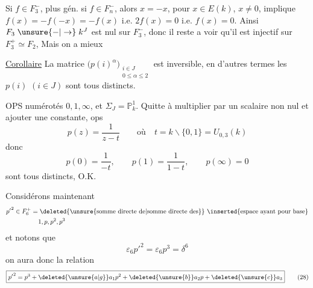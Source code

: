 Si $f\in F_3^-$, plus gén. si $f\in F_n^-$, alors $x=-x$, pour $x\in E(k)$, $x\ne0$, implique $f(x)=-f(-x)=-f(x)$ i.e. $2f(x)=0$ i.e. $f(x)=0$. Ainsi $F_3\mathrel{\unsure{-|\to}}k^{J}$ est nul sur $F_3^-$, donc il reste a voir qu'il est injectif sur $F_3^+\simeq F_2$, Mais on a mieux

\uline{Corollaire} La matrice   $\bigl(p(i)^\alpha\bigr)_{\substack{i\in J\\0\leq\alpha\leq2}}$ est inversible, en d'autres termes les $p(i)$ $(i\in J)$ sont tous distincts.

OPS   numérotés $0,1,\infty$, et $\Sigma_J=\mathbb P^1_k$. Quitte à multiplier par un scalaire non nul et ajouter une constante, ops
\[
 p(z)=\frac1{z-t}\qquad\text{où}\quad t=k\smallsetminus\{0,1\}=U_{0,3}(k)
\]
donc
\[
 p(0)=\frac1{-t},\qquad p(1)=\frac1{1-t},\qquad p(\infty)=0
\]
sont tous distincts, O.K.

 Considérons maintenant
\[
 \begin{aligned}
 &{p'}^{2}\in F_6^+=\deleted{\text{\unsure{somme directe de|somme directe des}}}\ \inserted{\text{espace ayant pour base}}\\
 &\hspace{5em}1,p,p^2,p^3
 \end{aligned}
\]
et notons que
\[
 \varepsilon_6{p'}^2=\varepsilon_6p^3=\delta^6
\]
on aura donc la relation
\[
 \boxed{{p'}^2=p^3+\deleted{\unsure{a|g}}a_1p^2+\deleted{\unsure{b}}a_2p+\deleted{\unsure{c}}a_3} \tag*{(28)}
\]
